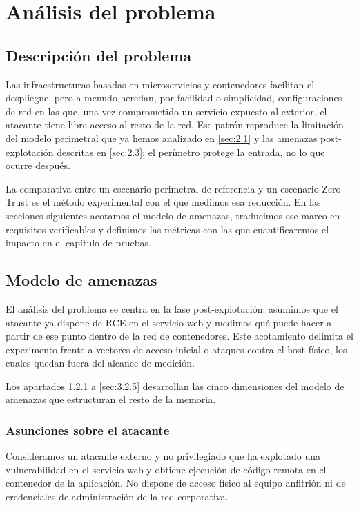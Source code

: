 \documentclass[11pt,spanish,listoffigures,listoftables]{tfgetsinf}
\begin{document}

\chapter{Análisis del problema}
 
    \section{Descripción del problema}
    Las infraestructuras basadas en microservicios y contenedores facilitan el despliegue, pero a menudo heredan, por facilidad o simplicidad, configuraciones de red en las que, una vez comprometido un servicio expuesto al exterior, el atacante tiene libre acceso al resto de la red. Ese patrón reproduce la limitación del modelo perimetral que ya hemos analizado en \cref{sec:2.1} y las amenazas post-explotación descritas en \cref{sec:2.3}: el perímetro protege la entrada, no lo que ocurre después.
    
    La comparativa entre un escenario perimetral de referencia y un escenario Zero Trust es el método experimental con el que medimos esa reducción. En las secciones siguientes acotamos el modelo de amenazas, traducimos ese marco en requisitos verificables y definimos las métricas con las que cuantificaremos el impacto en el capítulo de pruebas.
    
    
    \section{Modelo de amenazas}
    \label{sec:3.2}
    El análisis del problema se centra en la fase post-explotación: asumimos que el atacante ya dispone de RCE en el servicio web y medimos qué puede hacer a partir de ese punto dentro de la red de contenedores. Este acotamiento delimita el experimento frente a vectores de acceso inicial o ataques contra el host físico, los cuales quedan fuera del alcance de medición.

    Los apartados \cref{sec:3.2.1} a \cref{sec:3.2.5} desarrollan las cinco dimensiones del modelo de amenazas que estructuran el resto de la memoria.
    
        \subsection{Asunciones sobre el atacante}
        \label{sec:3.2.1}
        Consideramos un atacante externo y no privilegiado que ha explotado una vulnerabilidad en el servicio web y obtiene ejecución de código remota en el contenedor de la aplicación. No dispone de acceso físico al equipo anfitrión ni de credenciales de administración de la red corporativa. 
\end{document}
